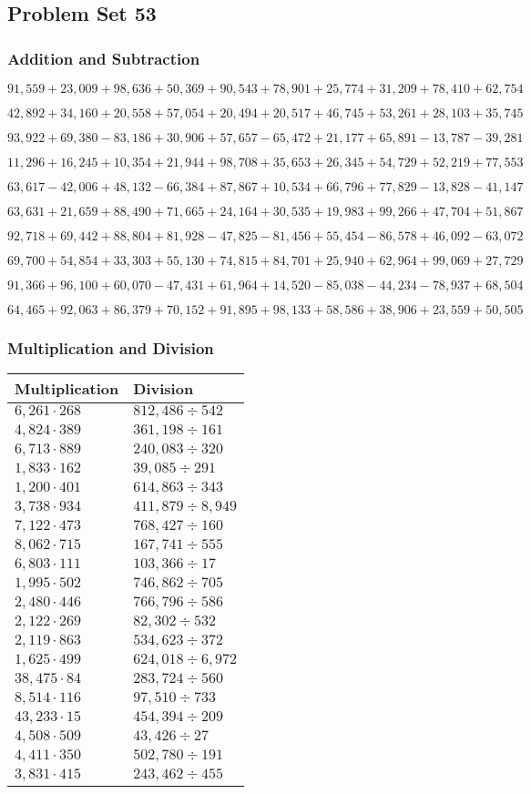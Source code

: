 \hypertarget{problem-set-53-3}{%
\subsection{Problem Set 53}\label{problem-set-53-3}}

\hypertarget{addition-and-subtraction-275}{%
\subsubsection{Addition and
Subtraction}\label{addition-and-subtraction-275}}

\(91,559+23,009+98,636+50,369+90,543+78,901+25,774+31,209+78,410+ 62,754\)

\(42,892+34,160+20,558+57,054+20,494+20,517+46,745+53,261+28,103+35,745\)

\(93,922+69,380-83,186+30,906+57,657-65,472+21,177+65,891-13,787-39,281\)

\(11,296+16,245+10,354+21,944+98,708+35,653+26,345+54,729+52,219+77,553\)

\(63,617-42,006+48,132-66,384+87,867+10,534+66,796+77,829-13,828-41,147\)

\(63,631+21,659+88,490+71,665+24,164+30,535+19,983+99,266+47,704+51,867\)

\(92,718+69,442+88,804+81,928-47,825-81,456+55,454-86,578+46,092-63,072\)

\(69,700+54,854+33,303+55,130+74,815+84,701+25,940+62,964+99,069+27,729\)

\(91,366+96,100+60,070-47,431+61,964+14,520-85,038-44,234-78,937+68,504\)

\(64,465+92,063+86,379+70,152+91,895+98,133+58,586+38,906+23,559+50,505\)

\hypertarget{multiplication-and-division-274}{%
\subsubsection{Multiplication and
Division}\label{multiplication-and-division-274}}

\begin{longtable}[]{@{}ll@{}}
\toprule
Multiplication & Division\tabularnewline
\midrule
\endhead
\(6,261\cdot268\) & \(812,486÷542\)\tabularnewline
\(4,824\cdot389\) & \(361,198÷161\)\tabularnewline
\(6,713\cdot889\) & \(240,083÷320\)\tabularnewline
\(1,833\cdot162\) & \(39,085÷291\)\tabularnewline
\(1,200\cdot401\) & \(614,863÷343\)\tabularnewline
\(3,738\cdot934\) & \(411,879÷8,949\)\tabularnewline
\(7,122\cdot473\) & \(768,427÷160\)\tabularnewline
\(8,062\cdot715\) & \(167,741÷555\)\tabularnewline
\(6,803\cdot111\) & \(103,366÷17\)\tabularnewline
\(1,995\cdot502\) & \(746,862÷705\)\tabularnewline
\(2,480\cdot446\) & \(766,796÷586\)\tabularnewline
\(2,122\cdot269\) & \(82,302÷532\)\tabularnewline
\(2,119\cdot863\) & \(534,623÷372\)\tabularnewline
\(1,625\cdot499\) & \(624,018÷6,972\)\tabularnewline
\(38,475\cdot84\) & \(283,724÷560\)\tabularnewline
\(8,514\cdot116\) & \(97,510÷733\)\tabularnewline
\(43,233\cdot15\) & \(454,394÷209\)\tabularnewline
\(4,508\cdot509\) & \(43,426÷27\)\tabularnewline
\(4,411\cdot350\) & \(502,780÷191\)\tabularnewline
\(3,831\cdot415\) & \(243,462÷455\)\tabularnewline
\bottomrule
\end{longtable}

